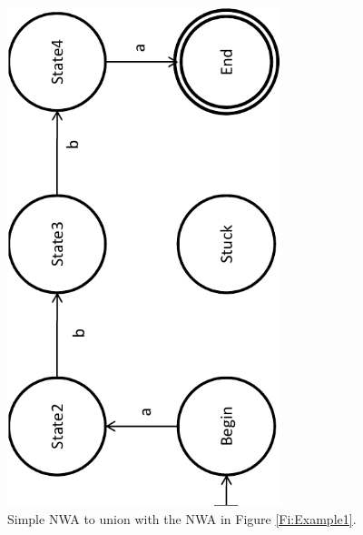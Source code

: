 \begin{figure}[htbp]
  \centering
    \includegraphics[width=8cm]{Figures/Figure3}
  \caption{Simple NWA to union with the NWA in Figure \ref{Fi:Example1}.}
  \label{Fi:Union1}
\end{figure}

